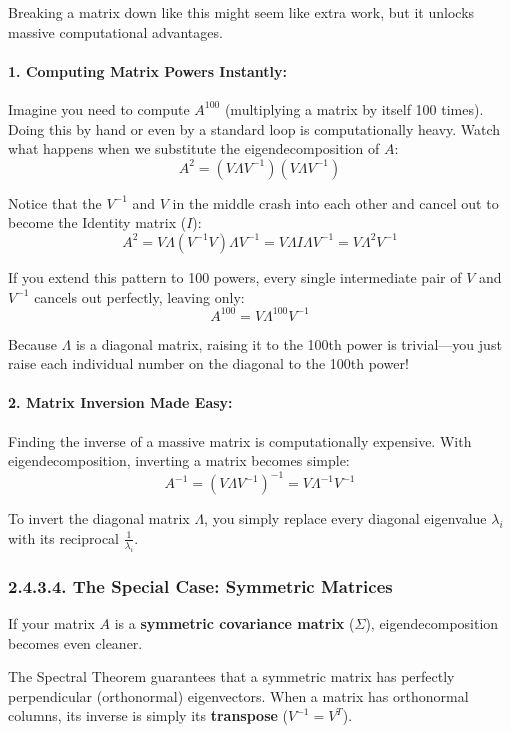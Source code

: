 \documentclass{article}
\begin{document}
Breaking a matrix down like this might seem like extra work, but it unlocks massive computational advantages. 

\paragraph{1. Computing Matrix Powers Instantly:}
Imagine you need to compute $A^{100}$ (multiplying a matrix by itself 100 times). Doing this by hand or even by a standard loop is computationally heavy. Watch what happens when we substitute the eigendecomposition of $A$:
\[ A^2 = (V \Lambda V^{-1})(V \Lambda V^{-1}) \]

Notice that the $V^{-1}$ and $V$ in the middle crash into each other and cancel out to become the Identity matrix ($I$):
\[ A^2 = V \Lambda (V^{-1} V) \Lambda V^{-1} = V \Lambda I \Lambda V^{-1} = V \Lambda^2 V^{-1} \]

If you extend this pattern to 100 powers, every single intermediate pair of $V$ and $V^{-1}$ cancels out perfectly, leaving only:
\[ A^{100} = V \Lambda^{100} V^{-1} \]

Because $\Lambda$ is a diagonal matrix, raising it to the 100th power is trivial—you just raise each individual number on the diagonal to the 100th power!

\paragraph{2. Matrix Inversion Made Easy:}
Finding the inverse of a massive matrix is computationally expensive. With eigendecomposition, inverting a matrix becomes simple:
\[ A^{-1} = (V \Lambda V^{-1})^{-1} = V \Lambda^{-1} V^{-1} \]

To invert the diagonal matrix $\Lambda$, you simply replace every diagonal eigenvalue $\lambda_i$ with its reciprocal $\frac{1}{\lambda_i}$. 

\subsubsection*{2.4.3.4. The Special Case: Symmetric Matrices}

If your matrix $A$ is a \textbf{symmetric covariance matrix} ($\Sigma$), eigendecomposition becomes even cleaner. 

The Spectral Theorem guarantees that a symmetric matrix has perfectly perpendicular (orthonormal) eigenvectors. When a matrix has orthonormal columns, its inverse is simply its \textbf{transpose} ($V^{-1} = V^T$).
\end{document}

